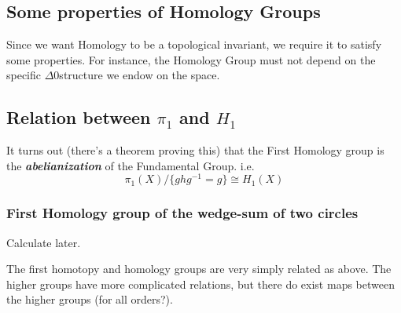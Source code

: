 \documentclass{article}
\begin{document}
\vskip 1cm
\subsection{Some properties of Homology Groups}

\vskip 0.5cm 
Since we want Homology to be a topological invariant, we require it to satisfy some properties. For instance, the Homology Group must not depend on the specific $\Delta$0structure we endow on the space.

\vskip 1cm 
\subsection*{Relation between $\pi_1$ and $H_1$}

It turns out (there's a theorem proving this) that the First Homology group is the \emph{\textbf{abelianization}} of the Fundamental Group. i.e.
\[ \pi_1(X) /\{ghg^{-1} = g\} \cong H_1(X) \]

\vskip 1cm 
\subsubsection*{First Homology group of the wedge-sum of two circles}
Calculate later.

\vskip 1cm 
The first homotopy and homology groups are very simply related as above. The higher groups have more complicated relations, but there do exist maps between the higher groups (for all orders?).
\end{document}
